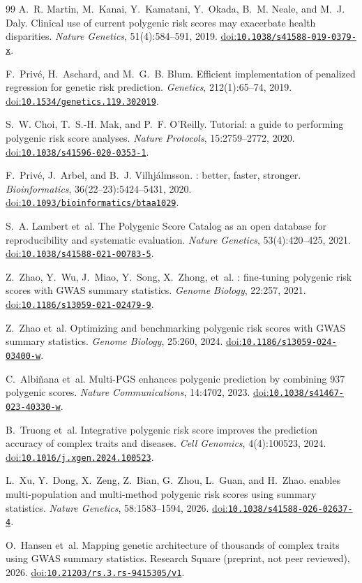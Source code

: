 \documentclass[11pt,a4paper]{article}
\newcommand{\doi}[1]{\href{https://doi.org/#1}{doi:\allowbreak\texttt{#1}}}
\begin{document}
\begin{thebibliography}{99}
A.~R. Martin, M.~Kanai, Y.~Kamatani, Y.~Okada, B.~M. Neale, and
M.~J. Daly.
\newblock Clinical use of current polygenic risk scores may
exacerbate health disparities.
\newblock \emph{Nature Genetics}, 51(4):584--591, 2019.
\newblock \doi{10.1038/s41588-019-0379-x}.

F.~Priv\'e, H.~Aschard, and M.~G.~B. Blum.
\newblock Efficient implementation of penalized regression for
genetic risk prediction.
\newblock \emph{Genetics}, 212(1):65--74, 2019.
\newblock \doi{10.1534/genetics.119.302019}.

S.~W. Choi, T.~S.-H. Mak, and P.~F. O'Reilly.
\newblock Tutorial: a guide to performing polygenic risk score
analyses.
\newblock \emph{Nature Protocols}, 15:2759--2772, 2020.
\newblock \doi{10.1038/s41596-020-0353-1}.

F.~Priv\'e, J.~Arbel, and B.~J. Vilhj\'almsson.
: better, faster, stronger.
\newblock \emph{Bioinformatics}, 36(22--23):5424--5431, 2020.
\newblock \doi{10.1093/bioinformatics/btaa1029}.

S.~A. Lambert et~al.
\newblock The {P}olygenic {S}core {C}atalog as an open database for
reproducibility and systematic evaluation.
\newblock \emph{Nature Genetics}, 53(4):420--425, 2021.
\newblock \doi{10.1038/s41588-021-00783-5}.

Z.~Zhao, Y.~Wu, J.~Miao, Y.~Song, X.~Zhong, et~al.
: fine-tuning polygenic risk scores with {GWAS}
summary statistics.
\newblock \emph{Genome Biology}, 22:257, 2021.
\newblock \doi{10.1186/s13059-021-02479-9}.

Z.~Zhao et~al.
\newblock Optimizing and benchmarking polygenic risk scores with
{GWAS} summary statistics.
\newblock \emph{Genome Biology}, 25:260, 2024.
\newblock \doi{10.1186/s13059-024-03400-w}.

C.~Albi\~nana et~al.
\newblock Multi-{PGS} enhances polygenic prediction by combining
937 polygenic scores.
\newblock \emph{Nature Communications}, 14:4702, 2023.
\newblock \doi{10.1038/s41467-023-40330-w}.

B.~Truong et~al.
\newblock Integrative polygenic risk score improves the prediction
accuracy of complex traits and diseases.
\newblock \emph{Cell Genomics}, 4(4):100523, 2024.
\newblock \doi{10.1016/j.xgen.2024.100523}.

L.~Xu, Y.~Dong, X.~Zeng, Z.~Bian, G.~Zhou, L.~Guan, and
H.~Zhao.
 enables multi-population and multi-method
polygenic risk scores using summary statistics.
\newblock \emph{Nature Genetics}, 58:1583--1594, 2026.
\newblock \doi{10.1038/s41588-026-02637-4}.

O.~Hansen et~al.
\newblock Mapping genetic architecture of thousands of complex
traits using {GWAS} summary statistics.
\newblock Research Square (preprint, not peer reviewed), 2026.
\newblock \doi{10.21203/rs.3.rs-9415305/v1}.

\end{thebibliography}
\end{document}

